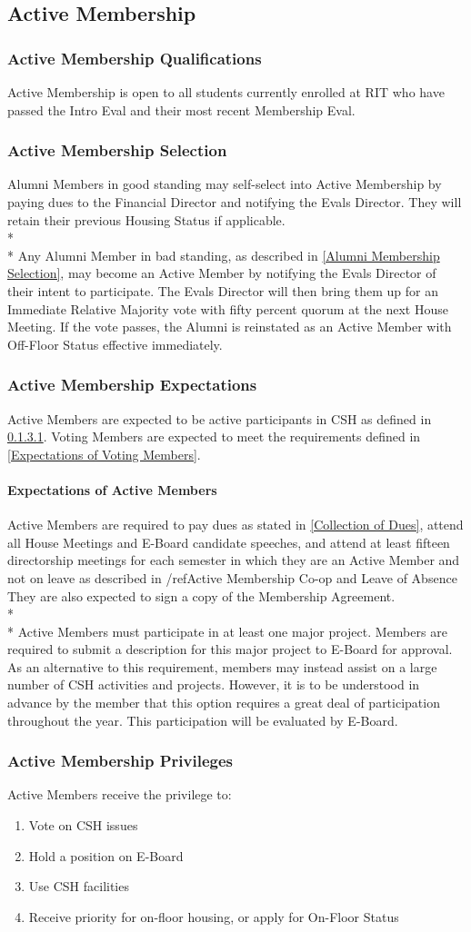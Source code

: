 \documentclass{article}
\newcommand{\asection}[1]{\subsection{#1} \label{#1}}
\newcommand{\asubsection}[1]{\subsubsection{#1} \label{#1}}
\newcommand{\asubsubsection}[1]{\paragraph{#1} \label{#1}}
\begin{document}
\asection{Active Membership}

\asubsection{Active Membership Qualifications}
Active Membership is open to all students currently enrolled at RIT who have passed the Intro Eval and their most recent Membership Eval.

\asubsection{Active Membership Selection}
Alumni Members in good standing may self-select into Active Membership by paying dues to the Financial Director and notifying the Evals Director. They will retain their previous Housing Status if applicable.
\\*\\*
Any Alumni Member in bad standing, as described in \ref{Alumni Membership Selection}, may become an Active Member by notifying the Evals Director of their intent to participate.
The Evals Director will then bring them up for an Immediate Relative Majority vote with fifty percent quorum at the next House Meeting.
If the vote passes, the Alumni is reinstated as an Active Member with Off-Floor Status effective immediately.

\asubsection{Active Membership Expectations}
Active Members are expected to be active participants in CSH as defined in \ref{Expectations of Active Members}.
Voting Members are expected to meet the requirements defined in \ref{Expectations of Voting Members}.

\asubsubsection{Expectations of Active Members}
Active Members are required to pay dues as stated in \ref{Collection of Dues}, attend all House Meetings and E-Board candidate speeches, and attend at least fifteen directorship meetings for each semester in which they are an Active Member and not on leave as described in /ref{Active Membership Co-op and Leave of Absence}
They are also expected to sign a copy of the Membership Agreement.
\\* \\*
Active Members must participate in at least one major project.
Members are required to submit a description for this major project to E-Board for approval.
As an alternative to this requirement, members may instead assist on a large number of CSH activities and projects.
However, it is to be understood in advance by the member that this option requires a great deal of participation throughout the year.
This participation will be evaluated by E-Board.

\asubsection{Active Membership Privileges}
Active Members receive the privilege to:
\begin{enumerate}
	\item Vote on CSH issues
	\item Hold a position on E-Board
	\item Use CSH facilities
	\item Receive priority for on-floor housing, or apply for On-Floor Status
\end{enumerate}
\end{document}
